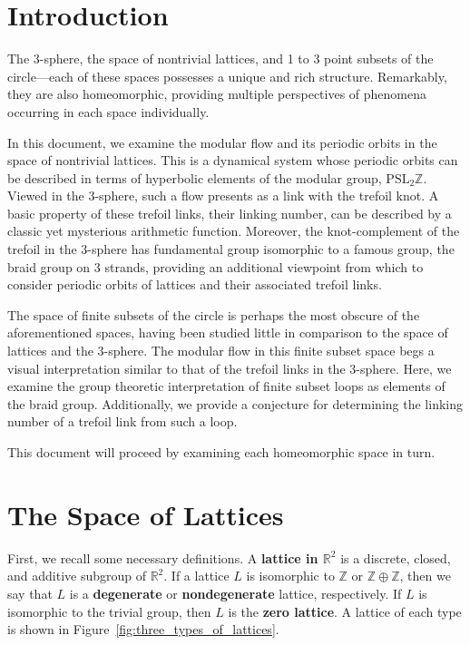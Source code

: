 \documentclass[12pt,twoside]{reedthesis}
\theoremstyle{definition}
\newcommand{\Z}{\mathbb{Z}}
\newcommand{\R}{\mathbb{R}}
\newcommand{\PSLZ}{\mathrm{PSL}_2{\Z}}
\newcommand{\defnphrase}[1]{\textbf{#1}}
\begin{document}

\mainmatter
\pagestyle{fancyplain}

\chapter*{Introduction}

The 3-sphere, the space of nontrivial lattices, and 1 to 3 point subsets of the circle---each of these spaces possesses a unique and rich structure.
Remarkably, they are also homeomorphic, providing multiple perspectives of phenomena occurring in each space individually.

In this document, we examine the modular flow and its periodic orbits in the space of nontrivial lattices.
This is a dynamical system whose periodic orbits can be described in terms of hyperbolic elements of the modular group, $\PSLZ$.
Viewed in the 3-sphere, such a flow presents as a link with the trefoil knot.
A basic property of these trefoil links, their linking number, can be described by a classic yet mysterious arithmetic function.
Moreover, the knot-complement of the trefoil in the 3-sphere has fundamental group isomorphic to a famous group, the braid group on 3 strands, providing an additional viewpoint from which to consider periodic orbits of lattices and their associated trefoil links.

The space of finite subsets of the circle is perhaps the most obscure of the aforementioned spaces, having been studied little in comparison to the space of lattices and the 3-sphere.
The modular flow in this finite subset space begs a visual interpretation similar to that of the trefoil links in the 3-sphere.
Here, we examine the group theoretic interpretation of finite subset loops as elements of the braid group.
Additionally, we provide a conjecture for determining the linking number of a trefoil link from such a loop.

This document will proceed by examining each homeomorphic space in turn.

\chapter{The Space of Lattices}

First, we recall some necessary definitions.
A \defnphrase{lattice in $\R^2$} is a discrete, closed, and additive subgroup of $\R^2$.
If a lattice $L$ is isomorphic to $\Z$ or $\Z \oplus \Z$, then we say that $L$ is a \defnphrase{degenerate} or \defnphrase{nondegenerate} lattice, respectively.
If $L$ is isomorphic to the trivial group, then $L$ is the \defnphrase{zero lattice}. A lattice of each type is shown in Figure~\ref{fig:three_types_of_lattices}.
\end{document}
